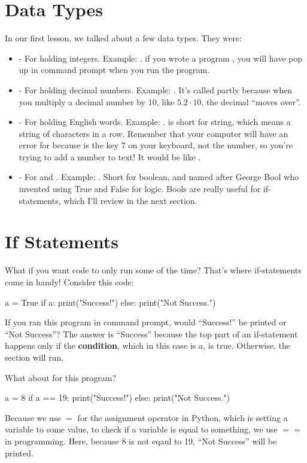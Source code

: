 \documentclass[12pt]{scrartcl}
\begin{document}
\section{Data Types}
In our first lesson, we talked about a few data types. They were:
\begin{itemize}
    \item {} - For holding integers. Example: . if you wrote a program , you will have  pop up in command prompt when you run the program.
    \item {} - For holding decimal numbers. Example: . It's called  partly because when you multiply a decimal number by 10, like $5.2 \cdot 10$, the decimal ``moves over''.
    \item {} - For holding English words. Example: .  is short for string, which means a string of characters in a row. Remember that your computer will have an error for  because  is the key 7 on your keyboard, not the number, so you're trying to add a number to text! It would be like .
    \item {} - For  and . Example: . Short for boolean, and named after George Bool who invented using True and False for logic. Bools are really useful for if-statements, which I'll review in the next section.
\end{itemize}

\section{If Statements}
What if you want code to only run some of the time? That's where if-statements come in handy! Consider this code:
\begin{python}
    a = True
    if a:
        print("Success!")
    else:
        print("Not Success.")
\end{python}
If you ran this program in command prompt, would ``Success!'' be printed or ``Not Success''? The answer is ``Success'' because the top part of an if-statement happens only if the \textbf{condition}, which in this case is $a$, is true. Otherwise, the  section will run.

What about for this program?
\begin{python}
    a = 8
    if a == 19:
        print("Success!")
    else:
        print("Not Success.")
\end{python}
Because we use $=$ for the assignment operator in Python, which is setting a variable to some value, to check if a variable is equal to something, we use $==$ in programming. Here, because $8$ is not eqaul to 19, ``Not Success'' will be printed.
\end{document}
